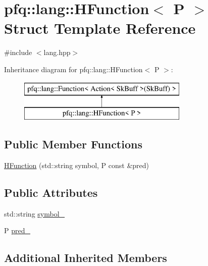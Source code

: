 \hypertarget{structpfq_1_1lang_1_1HFunction}{\section{pfq\+:\+:lang\+:\+:H\+Function$<$ P $>$ Struct Template Reference}
\label{structpfq_1_1lang_1_1HFunction}
}


{\ttfamily \#include $<$lang.\+hpp$>$}

Inheritance diagram for pfq\+:\+:lang\+:\+:H\+Function$<$ P $>$\+:\begin{figure}[H]
\begin{center}
\leavevmode
\includegraphics[height=2.000000cm]{structpfq_1_1lang_1_1HFunction}
\end{center}
\end{figure}
\subsection*{Public Member Functions}
\begin{DoxyCompactItemize}
\item 
\hyperlink{structpfq_1_1lang_1_1HFunction_a0febd7adba8089f29406c53b2aacf9f8}{H\+Function} (std\+::string symbol, P const \&pred)
\end{DoxyCompactItemize}
\subsection*{Public Attributes}
\begin{DoxyCompactItemize}
\item 
std\+::string \hyperlink{structpfq_1_1lang_1_1HFunction_abc7fde88d22a314a9ec4c39a011038fc}{symbol\+\_\+}
\item 
P \hyperlink{structpfq_1_1lang_1_1HFunction_a54891a65796c00f579b6e00260d85af9}{pred\+\_\+}
\end{DoxyCompactItemize}
\subsection*{Additional Inherited Members}


